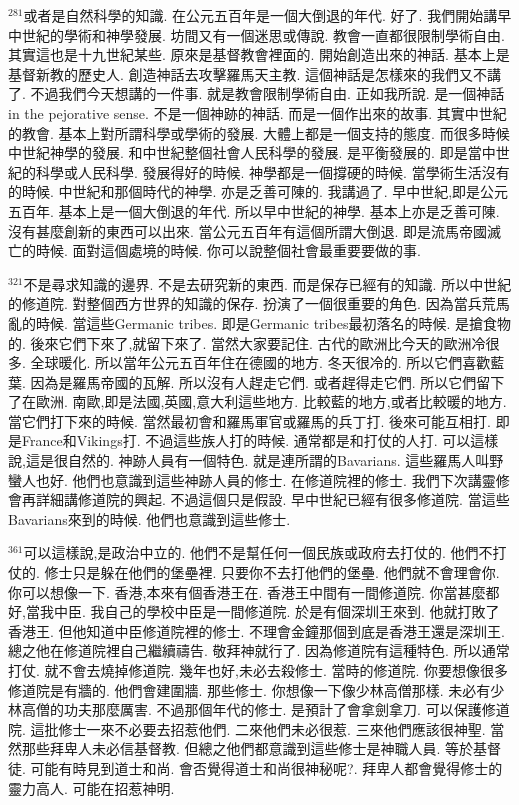 \documentclass{book}
\begin{document}
$^{281}$或者是自然科學的知識.
在公元五百年是一個大倒退的年代.
好了.
我們開始講早中世紀的學術和神學發展.
坊間又有一個迷思或傳說.
教會一直都很限制學術自由.
其實這也是十九世紀某些.
原來是基督教會裡面的.
開始創造出來的神話.
基本上是基督新教的歷史人.
創造神話去攻擊羅馬天主教.
這個神話是怎樣來的我們又不講了.
不過我們今天想講的一件事.
就是教會限制學術自由.
正如我所說.
是一個神話in the pejorative sense.
不是一個神跡的神話.
而是一個作出來的故事.
其實中世紀的教會.
基本上對所謂科學或學術的發展.
大體上都是一個支持的態度.
而很多時候中世紀神學的發展.
和中世紀整個社會人民科學的發展.
是平衡發展的.
即是當中世紀的科學或人民科學.
發展得好的時候.
神學都是一個撐硬的時候.
當學術生活沒有的時候.
中世紀和那個時代的神學.
亦是乏善可陳的.
我講過了.
早中世紀,即是公元五百年.
基本上是一個大倒退的年代.
所以早中世紀的神學.
基本上亦是乏善可陳.
沒有甚麼創新的東西可以出來.
當公元五百年有這個所謂大倒退.
即是流馬帝國滅亡的時候.
面對這個處境的時候.
你可以說整個社會最重要要做的事.

$^{321}$不是尋求知識的邊界.
不是去研究新的東西.
而是保存已經有的知識.
所以中世紀的修道院.
對整個西方世界的知識的保存.
扮演了一個很重要的角色.
因為當兵荒馬亂的時候.
當這些Germanic tribes.
即是Germanic tribes最初落名的時候.
是搶食物的.
後來它們下來了,就留下來了.
當然大家要記住.
古代的歐洲比今天的歐洲冷很多.
全球暖化.
所以當年公元五百年住在德國的地方.
冬天很冷的.
所以它們喜歡藍葉.
因為是羅馬帝國的瓦解.
所以沒有人趕走它們.
或者趕得走它們.
所以它們留下了在歐洲.
南歐,即是法國,英國,意大利這些地方.
比較藍的地方,或者比較暖的地方.
當它們打下來的時候.
當然最初會和羅馬軍官或羅馬的兵丁打.
後來可能互相打.
即是France和Vikings打.
不過這些族人打的時候.
通常都是和打仗的人打.
可以這樣說,這是很自然的.
神跡人員有一個特色.
就是連所謂的Bavarians.
這些羅馬人叫野蠻人也好.
他們也意識到這些神跡人員的修士.
在修道院裡的修士.
我們下次講靈修會再詳細講修道院的興起.
不過這個只是假設.
早中世紀已經有很多修道院.
當這些Bavarians來到的時候.
他們也意識到這些修士.

$^{361}$可以這樣說,是政治中立的.
他們不是幫任何一個民族或政府去打仗的.
他們不打仗的.
修士只是躲在他們的堡壘裡.
只要你不去打他們的堡壘.
他們就不會理會你.
你可以想像一下.
香港,本來有個香港王在.
香港王中間有一間修道院.
你當甚麼都好,當我中臣.
我自己的學校中臣是一間修道院.
於是有個深圳王來到.
他就打敗了香港王.
但他知道中臣修道院裡的修士.
不理會金鐘那個到底是香港王還是深圳王.
總之他在修道院裡自己繼續禱告.
敬拜神就行了.
因為修道院有這種特色.
所以通常打仗.
就不會去燒掉修道院.
幾年也好,未必去殺修士.
當時的修道院.
你要想像很多修道院是有牆的.
他們會建圍牆.
那些修士.
你想像一下像少林高僧那樣.
未必有少林高僧的功夫那麼厲害.
不過那個年代的修士.
是預計了會拿劍拿刀.
可以保護修道院.
這批修士一來不必要去招惹他們.
二來他們未必很惹.
三來他們應該很神聖.
當然那些拜卑人未必信基督教.
但總之他們都意識到這些修士是神職人員.
等於基督徒.
可能有時見到道士和尚.
會否覺得道士和尚很神秘呢?.
拜卑人都會覺得修士的靈力高人.
可能在招惹神明.
\end{document}
